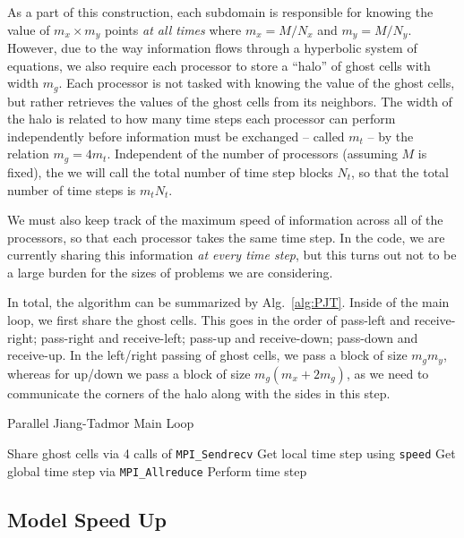 \documentclass{article}
\begin{document}
As a part of this construction, each subdomain is responsible for knowing the value of $m_x \times m_y$ points \textit{at all times} where $m_x = M/N_x$ and $m_y = M/N_y$. However, due to the way information flows through a hyperbolic system of equations, we also require each processor to store a ``halo'' of ghost cells with width $m_g.$ Each processor is not tasked with knowing the value of the ghost cells, but rather retrieves the values of the ghost cells from its neighbors. The width of the halo is related to how many time steps each processor can perform independently before information must be exchanged -- called $m_t$ -- by the relation $m_g = 4 m_t$. Independent of the number of processors (assuming $M$ is fixed), the we will call the total number of time step blocks $N_t$, so that the total number of time steps is $m_t N_t$. 

We must also keep track of the maximum speed of information across all of the processors, so that each processor takes the same time step. In the code, we are currently sharing this information \textit{at every time step}, but this turns out not to be a large burden for the sizes of problems we are considering. 

In total, the algorithm can be summarized by Alg.~\ref{alg:PJT}. Inside of the main loop, we first share the ghost cells. This goes in the order of pass-left and receive-right; pass-right and receive-left; pass-up and receive-down; pass-down and receive-up. In the left/right passing of ghost cells, we pass a block of size $m_g m_y$, whereas for up/down we pass a block of size $m_g (m_x + 2m_g)$, as we need to communicate the corners of the halo along with the sides in this step. 
\begin{algorithm}
\caption{Parallel Jiang-Tadmor Main Loop}\label{alg:PJT}
\begin{algorithmic}
    \State Share ghost cells via 4 calls of \texttt{MPI\_Sendrecv}
        \State Get local time step using \texttt{speed}
        \State Get global time step via \texttt{MPI\_Allreduce}
        \State Perform time step
    \EndFor
\EndFor
\end{algorithmic}
\end{algorithm}

\subsection{Model Speed Up}
\end{document}
